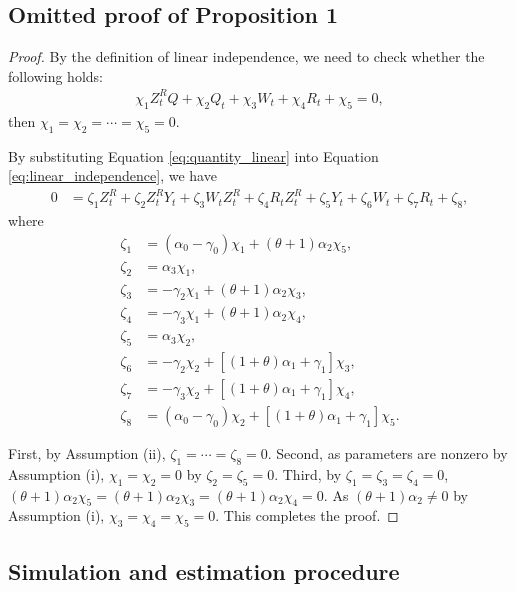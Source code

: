 \documentclass[11pt, a4paper]{article}
\begin{document}
\subsection{Omitted proof of Proposition 1}
\begin{proof}
    By the definition of linear independence, we need to check whether the following holds:
\begin{align}
    \chi_1 Z_{t}^R Q + \chi_2 Q_{t} + \chi_3 W_{t} + \chi_4 R_{t} + \chi_5 = 0, \label{eq:linear_independence}
\end{align}
then $\chi_1 = \chi_2 = \cdots = \chi_5 = 0$.

By substituting Equation \eqref{eq:quantity_linear} into Equation \eqref{eq:linear_independence}, we have
\begin{align*}
    0 &= \zeta_1 Z_{t}^R + \zeta_2 Z_{t}^RY_{t} + \zeta_3 W_{t}Z_{t}^R + \zeta_4 R_{t}Z_{t}^R + \zeta_5 Y_{t} + \zeta_6 W_{t} + \zeta_7 R_{t} + \zeta_8, 
\end{align*}
where 
\begin{align*}
    \zeta_1 &= (\alpha_0 - \gamma_0)\chi_1  + (\theta +1 )\alpha_2 \chi_5 ,\\
    \zeta_2 &= \alpha_3\chi_1,\\
    \zeta_3 &= -\gamma_2 \chi_1 + (\theta + 1)\alpha_2\chi_3,\\
    \zeta_4 &= -\gamma_3 \chi_1 + (\theta + 1)\alpha_2\chi_4,\\
    \zeta_5 &=  \alpha_3\chi_2,\\
    \zeta_6 &= -\gamma_2 \chi_2 + [(1 + \theta) \alpha_1 +\gamma_1]\chi_3,\\
    \zeta_7 &= -\gamma_3 \chi_2 +  [(1 + \theta) \alpha_1 +\gamma_1]\chi_4,\\
    \zeta_8 &=  (\alpha_0 - \gamma_0)\chi_2 +[(1 + \theta)\alpha_1 +\gamma_1] \chi_5.
\end{align*}

First, by Assumption (ii), $\zeta_1 = \cdots = \zeta_8 = 0$.
Second, as parameters are nonzero by Assumption (i), $\chi_1 = \chi_2 =0$ by $\zeta_2 = \zeta_5 = 0$.
Third, by $\zeta_1 = \zeta_3 = \zeta_4 = 0$, $(\theta + 1 )\alpha_2\chi_5 = (\theta + 1 )\alpha_2\chi_3 = (\theta + 1 )\alpha_2\chi_4 = 0.$
As $(\theta + 1)\alpha_2 \ne 0$ by Assumption (i), $\chi_3 = \chi_4 = \chi_5 = 0$.
This completes the proof.
\end{proof}

\subsection{Simulation and estimation procedure}
\end{document}
